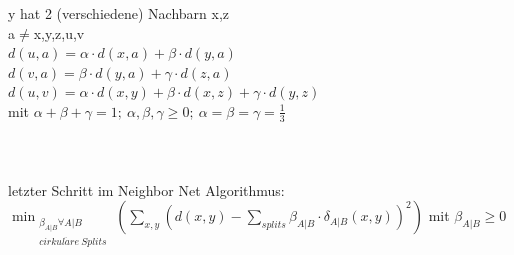 y hat 2 (verschiedene) Nachbarn x,z\\
a$\neq$x,y,z,u,v\\
$d(u,a)=\alpha \cdot d(x,a) + \beta \cdot d(y,a)$\\
$d(v,a)=\beta \cdot d(y,a) + \gamma \cdot d(z,a)$\\
$d(u,v)=\alpha \cdot d(x,y) + \beta \cdot d(x,z) + \gamma \cdot d(y,z)$\\
mit $\alpha + \beta + \gamma = 1;\ \alpha,\beta,\gamma \geq 0;\ \alpha=\beta=\gamma=\frac{1}{3}$\\\\
\\\\
letzter Schritt im Neighbor Net Algorithmus:\\
$\displaystyle \min_{\substack{\beta_{A|B} \forall A|B \\ cirkul\ddot{a}re\ Splits}} (\sum_{x,y} (d(x,y) - \sum_{splits} \beta_{A|B} \cdot \delta_{A|B}(x,y))^2)$ mit $\beta_{A|B} \geq 0$\\
